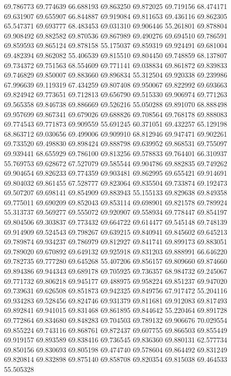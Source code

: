 69.786773
69.774639
66.688193
69.863250
69.872025
69.719156
68.474171
69.631907
69.655907
66.844887
69.919084
69.811653
69.436116
69.862305
65.547371
69.693777
68.483453
69.031310
69.906446
55.261801
69.878804
69.908492
69.882582
69.870536
69.867989
69.490276
69.694510
69.786591
69.859593
69.865124
69.878158
55.175037
69.859319
69.924491
69.681004
69.482394
69.862082
55.406539
69.815510
69.804450
69.748859
68.137807
69.734372
69.751563
68.554609
69.771141
69.038834
69.861872
69.839833
69.746829
69.850007
69.883660
69.896834
55.312504
69.920338
69.239986
67.996639
69.119319
67.434259
69.807408
69.950067
69.822992
69.693663
69.824942
69.773651
69.712813
69.656790
69.515330
69.906974
69.771263
69.565358
69.846738
69.886669
69.526216
55.050288
69.891070
68.888498
69.957699
69.867341
69.679026
69.688826
69.708564
69.768178
69.888083
69.774543
69.771873
69.909559
55.691245
60.371051
69.432257
65.129198
68.863712
69.030656
69.499006
69.909910
68.812946
69.947471
69.902261
69.733520
69.498830
69.898424
69.888798
69.639952
69.868531
69.755097
69.939441
68.655929
69.786100
69.813256
69.578833
69.764401
66.310937
55.769753
69.628672
67.527079
69.585544
69.904786
69.882835
69.749262
69.904654
69.826233
69.774359
69.903481
69.862995
69.655421
69.914691
69.804032
69.861455
67.528777
69.823064
69.835504
69.733874
69.192473
69.507207
69.698141
69.854909
69.883943
55.155133
69.829638
69.849358
69.775011
69.690209
69.852043
69.853114
69.698901
69.821578
69.789924
55.313737
69.569277
69.555072
69.920907
69.558934
69.778447
69.854197
69.804506
69.303837
69.773432
69.664722
69.614477
69.545148
69.748139
69.914909
69.524543
69.798267
69.639215
69.840941
69.845602
69.645213
69.789874
69.934237
69.786979
69.812927
69.841741
69.899173
69.883051
69.789020
69.670892
69.649132
69.925918
69.831203
69.888991
66.646220
69.782735
69.777280
69.645268
55.407206
69.856157
69.809660
69.874660
69.894386
69.944343
69.689178
69.705925
69.736357
68.984732
69.245067
69.771732
69.806218
69.945177
69.488975
69.958224
69.851237
69.947020
69.739631
69.626508
69.851873
69.942325
69.849756
67.917472
55.204116
69.934283
69.528456
69.824746
69.931379
69.811681
69.912083
69.817493
69.892841
69.941015
69.831468
69.861895
69.844642
55.220464
69.891728
69.772864
69.834680
69.848283
69.704503
69.789132
69.906676
70.029554
69.855224
69.743116
69.868761
69.872437
69.607755
69.866503
69.855449
69.919157
69.893589
69.838416
69.736545
69.836360
69.880131
62.577734
69.850156
69.830693
69.805198
69.474740
69.578604
69.864492
69.831249
69.820814
69.832898
69.875140
69.858708
69.820354
69.815038
69.464533
55.505328
